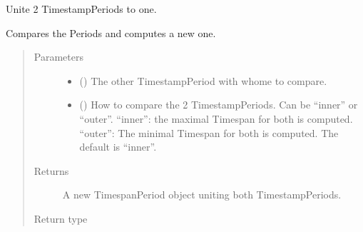 \documentclass[letterpaper,10pt,english]{sphinxmanual}
\begin{document}
\begin{fulllineitems}
\begin{fulllineitems}
\label{\detokenize{weatherDB.lib:weatherDB.lib.utils.TimestampPeriod.union}}
\sphinxAtStartPar
Unite 2 TimestampPeriods to one.

\sphinxAtStartPar
Compares the Periods and computes a new one.
\begin{quote}\begin{description}
\item[{Parameters}] \leavevmode\begin{itemize}
\item {} 
\sphinxAtStartPar
{} ({\hyperref[\detokenize{weatherDB.lib:weatherDB.lib.utils.TimestampPeriod}]{}}) \textendash{} The other TimestampPeriod with whome to compare.

\item {} 
\sphinxAtStartPar
{} (\sphinxstyleliteralemphasis{\sphinxupquote{, }}) \textendash{} How to compare the 2 TimestampPeriods.
Can be “inner” or “outer”.
“inner”: the maximal Timespan for both is computed.
“outer”: The minimal Timespan for both is computed.
The default is “inner”.

\end{itemize}

\item[{Returns}] \leavevmode
\sphinxAtStartPar
A new TimespanPeriod object uniting both TimestampPeriods.

\item[{Return type}] \leavevmode
\sphinxAtStartPar
{\hyperref[\detokenize{weatherDB.lib:weatherDB.lib.utils.TimestampPeriod}]{}}

\end{description}\end{quote}

\end{fulllineitems}


\end{fulllineitems}

\end{document}
